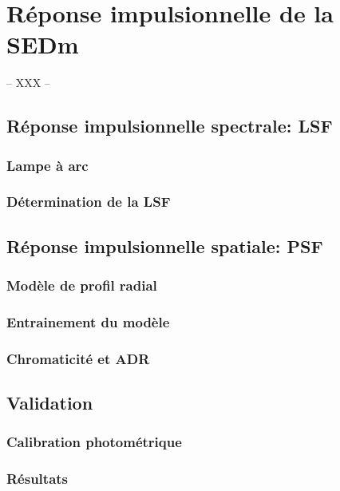 \documentclass[../main/main.tex]{subfiles}
\begin{document}
\chapter{Réponse impulsionnelle de la SEDm}\label{ch:irf}

-- XXX --

\minitoc
\newpage

\section{Réponse impulsionnelle spectrale: LSF}

\subsection{Lampe à arc}

\subsection{Détermination de la LSF}

\section{Réponse impulsionnelle spatiale: PSF}

\subsection{Modèle de profil radial}

\subsection{Entrainement du modèle}

\subsection{Chromaticité et ADR}\label{ssec:chromadr}

\section{Validation}

\subsection{Calibration photométrique}

\subsection{Résultats}
\end{document}
